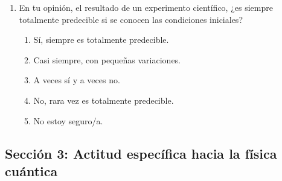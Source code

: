\documentclass[10pt,a4paper]{article}
\begin{document}
\begin{enumerate}
    \item En tu opinión, el resultado de un experimento científico, ¿es siempre totalmente predecible si se conocen las condiciones iniciales?
    \begin{enumerate}[label=\alph*)]
        \item Sí, siempre es totalmente predecible.
        \item Casi siempre, con pequeñas variaciones.
        \item A veces sí y a veces no.
        \item No, rara vez es totalmente predecible.
        \item No estoy seguro/a.
    \end{enumerate}
\end{enumerate}

\subsection{Sección 3: Actitud específica hacia la física cuántica}
\end{document}
